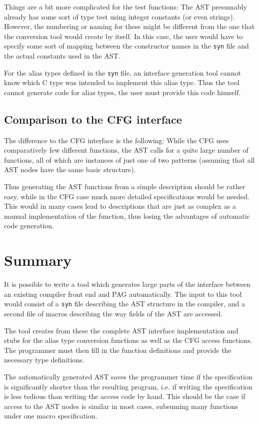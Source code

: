 Things are a bit more complicated for the test functions: The
AST presumably already has some sort of type test using integer
constants (or even strings). However, the numbering or naming for
these might be different from the one that the conversion tool would
create by itself. In this case, the user would have to specify some
sort of mapping between the constructor names in the \verb|syn| file
and the actual constants used in the AST.

For the alias types defined in the \verb|syn| file, an interface
generation tool cannot know which C type was intended to implement
this alias type. Thus the tool cannot generate code for alias types,
the user must provide this code himself.

\subsection{Comparison to the CFG interface}

The difference to the CFG interface is the following: While the CFG
uses comparatively few different functions, the AST calls for a
quite large number of functions, all of which are instances of just
one of two patterns (assuming that all AST nodes have the same basic
structure).

Thus generating the AST functions from a simple description should
be rather easy, while in the CFG case much more detailed
specifications would be needed. This would in many cases lead to
descriptions that are just as complex as a manual implementation
of the function, thus losing the advantages of automatic code
generation.

\section{Summary}

It is possible to write a tool which generates large parts of the
interface between an existing compiler front end and PAG
automatically. The input to this tool would consist of a \verb|syn|
file describing the AST structure in the compiler, and a second file
of macros describing the way fields of the AST are accessed.

The tool creates from these the complete AST interface
implementation and stubs for the alias type conversion functions as
well as the CFG access functions. The programmer must then fill in
the function definitions and provide the necessary type definitions.

The automatically generated AST saves the programmer time if the
specification is significantly shorter than the resulting program,
i.e. if writing the specification is less tedious than writing the
access code by hand. This should be the case if access to the AST
nodes is similar in most cases, subsuming many functions under one
macro specification.


